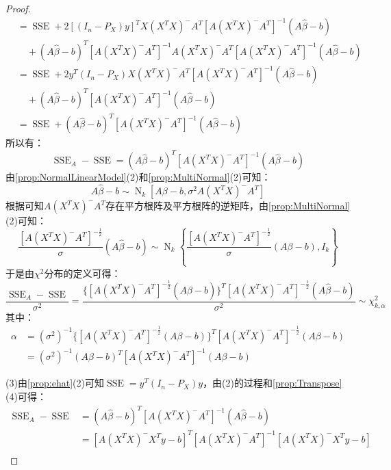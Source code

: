 \begin{proof}
\begin{align*}
		&=\operatorname{SSE}+2[(I_n-P_X)y]^TX(X^TX)^-A^T[A(X^TX)^-A^T]^{-1}(A\hat{\beta}-b) \\
		&\quad+(A\hat{\beta}-b)^T[A(X^TX)^-A^T]^{-1}A(X^TX)^-A^T[A(X^TX)^-A^T]^{-1}(A\hat{\beta}-b) \\
		&=\operatorname{SSE}+2y^T(I_n-P_X)X(X^TX)^-A^T[A(X^TX)^-A^T]^{-1}(A\hat{\beta}-b) \\
		&\quad+(A\hat{\beta}-b)^T[A(X^TX)^-A^T]^{-1}(A\hat{\beta}-b) \\
		&=\operatorname{SSE}+(A\hat{\beta}-b)^T[A(X^TX)^-A^T]^{-1}(A\hat{\beta}-b)
	\end{align*}
	所以有：
	\begin{equation*}
		\operatorname{SSE}_A-\operatorname{SSE}=(A\hat{\beta}-b)^T[A(X^TX)^-A^T]^{-1}(A\hat{\beta}-b)
	\end{equation*}
	由\cref{prop:NormalLinearModel}(2)和\cref{prop:MultiNormal}(2)可知：
	\begin{equation*}
		A\hat{\beta}-b\sim\operatorname{N}_k[A\beta-b,\sigma^2A(X^TX)^-A^T]
	\end{equation*}
	根据可知$A(X^TX)^-A^T$存在平方根阵及平方根阵的逆矩阵，由\cref{prop:MultiNormal}(2)可知：
	\begin{equation*}
		\frac{[A(X^TX)^-A^T]^{-\frac{1}{2}}}{\sigma}(A\hat{\beta}-b)\sim\operatorname{N}_k\left\{\frac{[A(X^TX)^-A^T]^{-\frac{1}{2}}}{\sigma}(A\beta-b),I_k\right\}
	\end{equation*}
	于是由$\chi^2$分布的定义可得：
	\begin{equation*}
		\frac{\operatorname{SSE}_A-\operatorname{SSE}}{\sigma^2}=\frac{\{[A(X^TX)^-A^T]^{-\frac{1}{2}}(A\hat{\beta}-b)\}^T[A(X^TX)^-A^T]^{-\frac{1}{2}}(A\hat{\beta}-b)}{\sigma^2}\sim\chi_{k,\alpha}^2
	\end{equation*}
	其中：
	\begin{align*}
		\alpha&=(\sigma^2)^{-1}\{[A(X^TX)^-A^T]^{-\frac{1}{2}}(A\beta-b)\}^T[A(X^TX)^-A^T]^{-\frac{1}{2}}(A\beta-b) \\
		&=(\sigma^2)^{-1}(A\beta-b)^T[A(X^TX)^-A^T]^{-1}(A\beta-b)
	\end{align*}\par
	(3)由\cref{prop:ehat}(2)可知$\operatorname{SSE}=y^T(I_n-P_X)y$，由(2)的过程和\cref{prop:Transpose}(4)可得：
	\begin{align*}
		\operatorname{SSE}_A-\operatorname{SSE}&=(A\hat{\beta}-b)^T[A(X^TX)^-A^T]^{-1}(A\hat{\beta}-b) \\
		&=[A(X^TX)^-X^Ty-b]^T[A(X^TX)^-A^T]^{-1}[A(X^TX)^-X^Ty-b] \\

\end{align*}
\end{proof}
